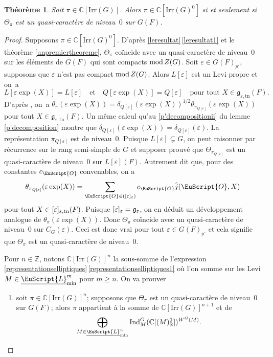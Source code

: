\documentclass[JEP,XML,SOM,Unicode,francais]{cedram}
\let\mathcal \EuScript
\newcommand{\NoChangel}[1]{%
\expandafter\let\csname old\string#1\endcsname=#1
\let#1=\relax
\newcommand{#1}{\mathcode`l="716C\csname old\string#1\endcsname\mathcode`l="7160 }%
}
\let\epsilon\varepsilon
\newcommand{\quadet}{\quad\text{et}\quad}
\newcommand{\rmod}{\textup{mod}\,}
\newcommand{\frg}{\mathfrak{g}}
\newcommand{\frl}{\mathfrak{l}}\NoChangel{\frl}
\newcommand{\Ell}{\mathrm{Ell}} \NoChangel{\Ell}
\newcommand{\Ind}{\mathrm{Ind}}
\newcommand{\Irr}{\mathrm{Irr}}
\newcommand{\Nil}{\mathrm{Nil}} \NoChangel{\Nil}
\newcommand{\tn}{\mathrm{tn}}
\newcommand{\cL}{\mathcal{L}}
\newcommand{\cO}{\mathcal{O}}
\newcommand{\CC}{\mathbb{C}}
\newcommand{\ZZ}{\mathbb{Z}}
\newcommand{\RR}{\mathbb{R}}
\theoremstyle{plain}
\newtheorem*{thm*}{Théorème}
\theoremstyle{definition}
\begin{document}
\label{caracterisation}

\begin{thm*}
Soit $\pi\in \CC[\Irr(G)]$. Alors $\pi\in \CC[\Irr(G)^0]$ si et seulement si $\Theta_{\pi}$ est un quasi-caractère de niveau~$0$ sur $G(F)$.
\end{thm*}

\begin{proof}
Supposons $\pi\in \CC[\Irr(G)^0]$. D'après \ref{leresultat}\,\eqref{leresultat1} et le théorème \ref{unpremiertheoreme}, $\Theta_{\pi}$ coïncide avec un quasi-caractère de niveau~$0$ sur les éléments de $G(F)$ qui sont compacts $\rmod Z(G)$. Soit $\epsilon\in G(F)_{p'}$, supposons que $\epsilon$ n'est pas compact $\rmod Z(G)$. Alors $L[\epsilon]$ est un Levi propre et on~a
\[
L[\epsilon \exp(X)]=L[\epsilon]\quadet Q[\epsilon \exp(X)]=Q[\epsilon]\quad \text{pour tout }X\in \frg_{\epsilon,\tn}(F).
\]
D'après \cite[Th.\,5.2]{C}, on~a $\theta_{\pi}(\epsilon \exp(X))=\delta_{Q[\epsilon]}(\epsilon \exp(X))^{1/2}\theta_{\pi_{Q[\epsilon]}}(\epsilon \exp(X))$ pour tout $X\in \frg_{\epsilon,\tn}(F)$. Un même calcul qu'au \eqref{p'decompositionii} du lemme \ref{p'decomposition} montre que $\delta_{Q[\epsilon]}(\epsilon \exp(X))=\delta_{Q[\epsilon]}(\epsilon)$. La représentation $\pi_{Q[\epsilon]}$ est de niveau~$0$. Puisque $L[\epsilon]\subsetneq G$, on peut raisonner par récurrence sur le rang semi-simple de $G$ et supposer prouvé que $\Theta_{\pi_{Q[\epsilon]}}$ est un quasi-caractère de niveau~$0$ sur $L[\epsilon](F)$. Autrement dit que, pour des constantes $c_{\cO}$ convenables, on a
\[
\theta_{\pi_{Q[\epsilon]}}(\epsilon \exp(X))=\sum_{\cO\in \Nil(\frl[\epsilon]_{\epsilon})}c_{\cO}\hat{j}(\cO,X)
\]
pour tout $X\in \frl[\epsilon]_{\epsilon,\tn}(F)$. Puisque $\frl[\epsilon]_{\epsilon}=\frg_{\epsilon}$, on en déduit un développement analogue de $\theta_{\pi}(\epsilon \exp(X))$. Donc $\Theta_{\pi}$ coïncide avec un quasi-caractère de niveau~$0$ sur $C_{G}(\epsilon)$. Ceci est donc vrai pour tout $\epsilon\in G(F)_{p'}$ et cela signifie que $\Theta_{\pi}$ est un quasi-caractère de niveau~$0$.

Pour $n\in \ZZ$, notons $\CC[\Irr(G)]^n$ la sous-somme de l'expression \ref{representationselliptiques}\,\eqref{representationselliptiques1} où l'on somme sur les Levi $M\in \underline{\cL}^m_{\min}$ pour $m\geq n$. On va prouver
\begin{enumerate}
\item\label{caracterisation1}
soit $\pi\in \CC[\Irr(G)]^n$; supposons que $\Theta_{\pi}$ est un quasi-caractère de niveau~$0$ sur $G(F)$; alors $\pi$ appartient à la somme de $\CC[\Irr(G)]^{n+1}$ et de
\[
\bigoplus_{M\in \underline{\cL}^n_{\min}}\Ind_{M}^G(\CC[\Ell(M)_{\RR}^0])^{W^G(M)}.
\]
\end{enumerate}


\end{proof}
\end{document}
